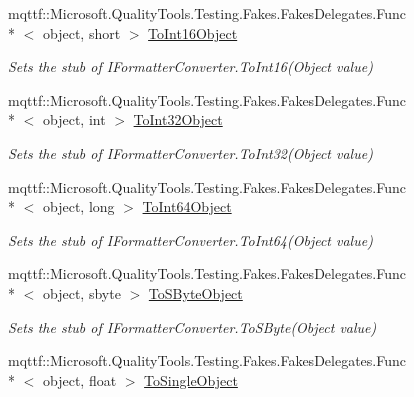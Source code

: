 \begin{DoxyCompactItemize}
mqttf\-::\-Microsoft.\-Quality\-Tools.\-Testing.\-Fakes.\-Fakes\-Delegates.\-Func\\*
$<$ object, short $>$ \hyperlink{class_system_1_1_runtime_1_1_serialization_1_1_fakes_1_1_stub_i_formatter_converter_a003b2df86700e3eca33de816acbf9b45}{To\-Int16\-Object}
\begin{DoxyCompactList}\small\item\em Sets the stub of I\-Formatter\-Converter.\-To\-Int16(\-Object value)\end{DoxyCompactList}\item 
mqttf\-::\-Microsoft.\-Quality\-Tools.\-Testing.\-Fakes.\-Fakes\-Delegates.\-Func\\*
$<$ object, int $>$ \hyperlink{class_system_1_1_runtime_1_1_serialization_1_1_fakes_1_1_stub_i_formatter_converter_acb3b74609c8d887f2927f62f61ba18a6}{To\-Int32\-Object}
\begin{DoxyCompactList}\small\item\em Sets the stub of I\-Formatter\-Converter.\-To\-Int32(\-Object value)\end{DoxyCompactList}\item 
mqttf\-::\-Microsoft.\-Quality\-Tools.\-Testing.\-Fakes.\-Fakes\-Delegates.\-Func\\*
$<$ object, long $>$ \hyperlink{class_system_1_1_runtime_1_1_serialization_1_1_fakes_1_1_stub_i_formatter_converter_a5df5060b8e033726f8519aaffc888c07}{To\-Int64\-Object}
\begin{DoxyCompactList}\small\item\em Sets the stub of I\-Formatter\-Converter.\-To\-Int64(\-Object value)\end{DoxyCompactList}\item 
mqttf\-::\-Microsoft.\-Quality\-Tools.\-Testing.\-Fakes.\-Fakes\-Delegates.\-Func\\*
$<$ object, sbyte $>$ \hyperlink{class_system_1_1_runtime_1_1_serialization_1_1_fakes_1_1_stub_i_formatter_converter_a36920022f648474378f9ea1ac81de680}{To\-S\-Byte\-Object}
\begin{DoxyCompactList}\small\item\em Sets the stub of I\-Formatter\-Converter.\-To\-S\-Byte(\-Object value)\end{DoxyCompactList}\item 
mqttf\-::\-Microsoft.\-Quality\-Tools.\-Testing.\-Fakes.\-Fakes\-Delegates.\-Func\\*
$<$ object, float $>$ \hyperlink{class_system_1_1_runtime_1_1_serialization_1_1_fakes_1_1_stub_i_formatter_converter_a264f4db22277fe6a85e6b5e863112027}{To\-Single\-Object}

\end{DoxyCompactItemize}
